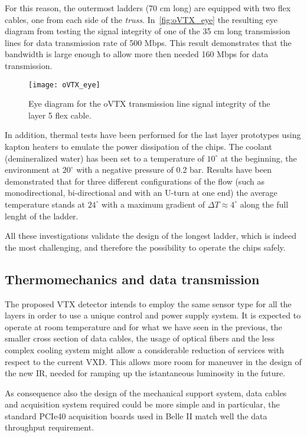 For this reason, the outermost ladders (70 cm long) are equipped with two flex cables, one from each side of the \textit{truss}. In~\autoref{fig:oVTX_eye} the resulting eye diagram from testing the signal integrity of one of the 35 cm long transmission lines for data transmission rate of 500 Mbps. This result demonstrates that the bandwidth is large enough to allow more then needed 160 Mbps for data transmission.


\begin{figure}[h!]
\centering
\texttt{[image: oVTX\_eye]}
\caption{Eye diagram for the oVTX transmission line signal integrity of the layer 5 flex cable.}
\label{fig:oVTX_eye}
\end{figure}


In addition, thermal tests have been performed for the last layer prototypes using kapton heaters to emulate the power dissipation of the chips. The coolant (demineralized water) has been set to a temperature of $10^{\circ}$ at the beginning, the environment at $20^{\circ}$ with a negative pressure of 0.2 bar. Results have been demonstrated that for three different configurations of the flow (such as monodirectional, bi-directional and with an U-turn at one end) the average temperature stands at $24^{\circ}$ with a maximum gradient of $\Delta T \approx 4^{\circ}$ along the full lenght of the ladder. 

All these investigations validate the design of the longest ladder, which is indeed the most challenging, and therefore the possibility to operate the chips safely.


\subsection{Thermomechanics and data transmission}

The proposed VTX detector intends to employ the same sensor type for all the layers in order to use a unique control and power supply system. It is expected to operate at room temperature and for what we have seen in the previous, the smaller cross section of data cables, the usage of optical fibers and the less complex cooling system might allow a considerable reduction of services with respect to the current VXD. This allows more room for maneuver in the design of the new IR, needed for ramping up the istantaneous luminosity in the future.

As consequence also the design of the mechanical support system, data cables and acquisition system required could be more simple and in particular, the standard PCIe40 acquisition boards used in Belle II match well the data throughput requirement.

